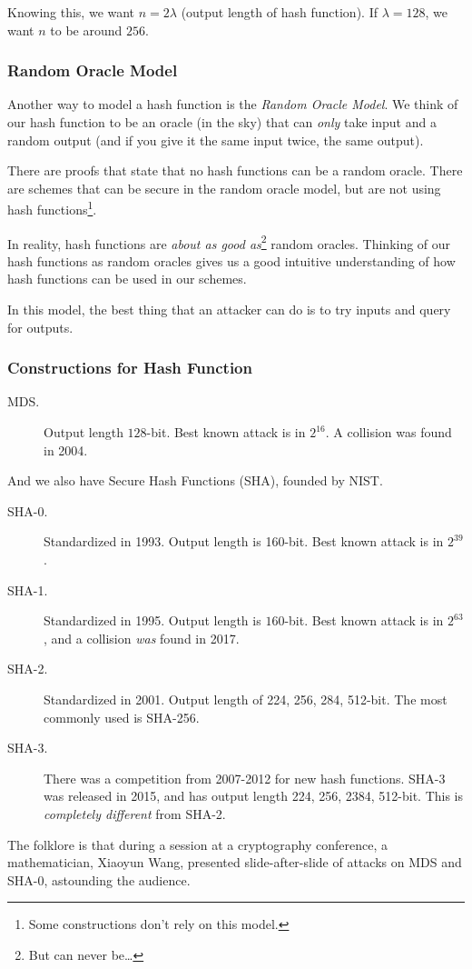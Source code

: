 Knowing this, we want $n = 2\lambda$ (output length of hash function). If $\lambda = 128$, we want $n$ to be around $256$.

\subsubsection{Random Oracle Model}
Another way to model a hash function is the \emph{Random Oracle Model}. We think of our hash function to be an oracle (in the sky) that can \emph{only} take input and a random output (and if you give it the same input twice, the same output).


There are proofs that state that no hash functions can be a random oracle. There are schemes that can be secure in the random oracle model, but are not using hash functions\footnote{Some constructions don't rely on this model.}.

In reality, hash functions are \emph{about as good as}\footnote{But can never be\dots} random oracles. Thinking of our hash functions as random oracles gives us a good intuitive understanding of how hash functions can be used in our schemes.

In this model, the best thing that an attacker can do is to try inputs and query for outputs.

\subsubsection{Constructions for Hash Function}
\begin{description}
    \item[MDS.] Output length $128$-bit. Best known attack is in $2^{16}$. A collision was found in 2004.
\end{description}
And we also have Secure Hash Functions (SHA), founded by NIST.
\begin{description}
    \item[SHA-0.] Standardized in 1993. Output length is 160-bit. Best known attack is in $2^{39}$.
    \item[SHA-1.] Standardized in 1995. Output length is $160$-bit. Best known attack is in $2^{63}$, and a collision \emph{was} found in 2017.
    \item[SHA-2.] Standardized in 2001. Output length of 224, 256, 284, 512-bit. The most commonly used is SHA-256.
    \item[SHA-3.] There was a competition from 2007-2012 for new hash functions. SHA-3 was released in 2015, and has output length 224, 256, 2384, 512-bit. This is \emph{completely different} from SHA-2.
\end{description}

\begin{remark*}
    The folklore is that during a session at a cryptography conference, a mathematician, Xiaoyun Wang, presented slide-after-slide of attacks on MDS and SHA-0, astounding the audience.
\end{remark*}